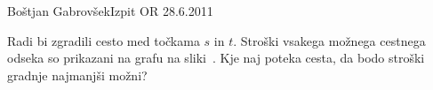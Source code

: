 \begin{naloga}{Boštjan Gabrovšek}{Izpit OR 28.6.2011}
\begin{vprasanje}
Radi bi zgradili cesto med točkama $s$ in $t$.
Stroški vsakega možnega cestnega odseka
so prikazani na grafu na sliki~\fig.
Kje naj poteka cesta, da bodo stroški gradnje najmanjši možni?

\begin{slika}
\pgfslika
{}
\end{slika}
\end{vprasanje}
\begin{odgovor}
\end{odgovor}
\end{naloga}
